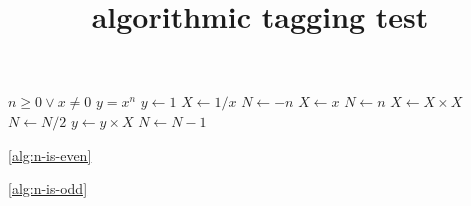 \documentclass{article}
\title{algorithmic tagging test}
\begin{document}
\begin{algorithmic}[1]
\REQUIRE $n \geq 0 \vee x \neq 0$
\ENSURE $y = x^n$
\STATE $y \leftarrow 1$
\STATE $X \leftarrow 1 / x$
\STATE $N \leftarrow -n$
\ELSE
\STATE $X \leftarrow x$
\STATE $N \leftarrow n$
\ENDIF
{}
\label{alg:n-is-even}
\STATE $X \leftarrow X \times X$
\STATE $N \leftarrow N / 2$
\ELSE[$N$ is odd] \label{alg:n-is-odd}
\STATE $y \leftarrow y \times X$
\STATE $N \leftarrow N - 1$
\ENDIF
\ENDWHILE
\end{algorithmic}

\ref{alg:n-is-even}

\ref{alg:n-is-odd}
\end{document}
